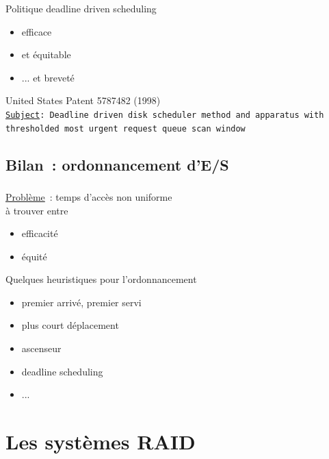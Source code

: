 \begin{frame}
\frametitle{\insertsubsection}
Politique deadline driven scheduling
\begin{itemize}
 \item \alert{efficace}
 \item et \alert{équitable}
\pause \item ... et breveté
\end{itemize}
\vspace{0.5cm}
\alert{United States Patent 5787482} (1998)\\
\vspace{0.5cm}
\texttt{\small\underline{Subject}: Deadline driven disk scheduler method and
  apparatus with thresholded most urgent request queue scan window}
\end{frame}


\subsection{Bilan~: ordonnancement d'E/S}
\begin{frame}
  \frametitle{\insertsubsection}
  \underline{Problème}~: \alert{temps d'accès non uniforme}\\
   à trouver entre 
  \begin{itemize}
  \item \alert{efficacité}
  \item \alert{équité}
  \end{itemize}
  Quelques heuristiques pour l'ordonnancement
  \begin{itemize}
  \item premier arrivé, premier servi
  \item plus court déplacement
  \item ascenseur
  \item \alert{deadline scheduling}
  \item ...
  \end{itemize}
\end{frame}

\section{Les systèmes RAID}
